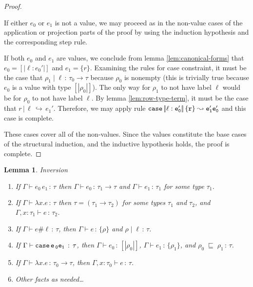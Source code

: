 \documentclass{article}
\newtheorem{lemma}{Lemma}
\newcommand{\variant}[1]{[\!|#1|\!]}
\newcommand{\case}[2]{\tt{case}\,#1\,#2}
\newcommand{\app}[2]{#1\,#2}
\newcommand{\lam}[2]{\lambda #1 . #2}
\newcommand{\hastp}[3]{#1 \vdash #2 \,:\, #3}
\newcommand{\haslbl}[3]{#1\;|\;#2\,:\, #3}
\newcommand{\caseVarRcd}[3]{#1 \;\sqsubseteq\; #2 \,:\, #3}
\newcommand{\haslbltm}[3]{#1\,|\,#2\,\hookrightarrow\, #3}
\newcommand{\step}[2]{#1 \leadsto #2}
\begin{document}
\begin{proof}
\begin{itemize}
    If either \(e_0\) or \(e_1\) is not a value, we may proceed as in the
    non-value cases of the application or projection parts of the proof by using
    the induction hypothesis and the corresponding step rule.

    If both \(e_0\) and \(e_1\) are values, we conclude from lemma
    \ref{lem:canonical-forms} that \(e_0 = \variant{\ell : e_0'}\) and \(e_1 =
    \{r\}\). Examining the rules for case constraint, it must be the case that
    \(\haslbl {\rho_1} \ell {\tau_0 \to \tau}\) because \(\rho_0\) is nonempty
    (this is trivially true because \(e_0\) is a value with type \(\variant
    {\rho_0}\)). The only way for \(\rho_1\) to not have label \(\ell\) would be
    for \(\rho_0\) to not have label \(\ell\). By lemma \ref{lem:row-type-term},
    it must be the case that \(\haslbltm{r}{\ell}{e_1'}\). Therefore, we may
    apply rule \(\step {\case {\variant {\ell : e_0'}} {\{r\}}} {e_1' e_0'}\)
    and this case is complete.
    
\end{itemize}

These cases cover all of the non-values. Since the values constitute the base
cases of the structural induction, and the inductive hypothesis holds, the proof
is complete.

\end{proof}

\begin{lemma}{Inversion} \label{lem:inversion}
\mbox{}
\begin{enumerate}
\item If $\hastp{\Gamma}{\app{e_0}{e_1}}{\tau}$ then
  $\hastp{\Gamma}{e_0}{\tau_1\to\tau}$ and $\hastp{\Gamma}{e_1}{\tau_1}$ for some type $\tau_1$.
\item If $\hastp{\Gamma}{\lam{x}{e}}{\tau}$ then $\tau = (\tau_1\to\tau_2)$ for
some types $\tau_1$ and $\tau_2$, and
  $\hastp{\Gamma,x:\tau_1}{e}{\tau_2}$.
\item If \(\hastp \Gamma {e \# \ell} \tau\), then \(\hastp \Gamma e {\{\rho\}}\)
  and \(\haslbl \rho \ell \tau\).
\item If \(\hastp \Gamma {\case e_0 e_1} \tau\), then \(\hastp \Gamma {e_0}
  {\variant {\rho_0}}\), \(\hastp \Gamma {e_1} {\{\rho_1\}}\), and \(\caseVarRcd
  {\rho_0} {\rho_1} \tau\).
\item If \(\hastp \Gamma {\lambda x. e} {\tau_0 \to \tau}\), then \(\hastp
  {\Gamma, x : \tau_0} e \tau\).
\item Other facts as needed\ldots
\end{enumerate}
\end{lemma}
\end{document}
